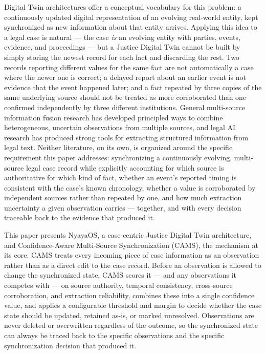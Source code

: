 \documentclass[conference]{IEEEtran}
\begin{document}
Digital Twin architectures offer a conceptual vocabulary for this problem: a
continuously updated digital representation of an evolving real-world
entity, kept synchronized as new information about that entity arrives.
Applying this idea to a legal case is natural --- the case \emph{is} an
evolving entity with parties, events, evidence, and proceedings --- but a
Justice Digital Twin cannot be built by simply storing the newest record for
each fact and discarding the rest. Two records reporting different values
for the same fact are not automatically a case where the newer one is
correct; a delayed report about an earlier event is not evidence that the
event happened later; and a fact repeated by three copies of the same
underlying source should not be treated as more corroborated than one
confirmed independently by three different institutions. General
multi-source information fusion research has developed principled ways to
combine heterogeneous, uncertain observations from multiple sources, and
legal AI research has produced strong tools for extracting structured
information from legal text. Neither literature, on its own, is organized
around the specific requirement this paper addresses: synchronizing a
continuously evolving, multi-source legal case record while explicitly
accounting for which source is authoritative for which kind of fact, whether
an event's reported timing is consistent with the case's known chronology,
whether a value is corroborated by independent sources rather than repeated
by one, and how much extraction uncertainty a given observation carries ---
together, and with every decision traceable back to the evidence that
produced it.

This paper presents NyayaOS, a case-centric Justice Digital Twin
architecture, and Confidence-Aware Multi-Source Synchronization (CAMS), the
mechanism at its core. CAMS treats every incoming piece of case information
as an observation rather than as a direct edit to the case record. Before an
observation is allowed to change the synchronized state, CAMS scores it ---
and any observations it competes with --- on source authority, temporal
consistency, cross-source corroboration, and extraction reliability,
combines these into a single confidence value, and applies a configurable
threshold and margin to decide whether the case state should be updated,
retained as-is, or marked unresolved. Observations are never deleted or
overwritten regardless of the outcome, so the synchronized state can always
be traced back to the specific observations and the specific synchronization
decision that produced it.
\end{document}
